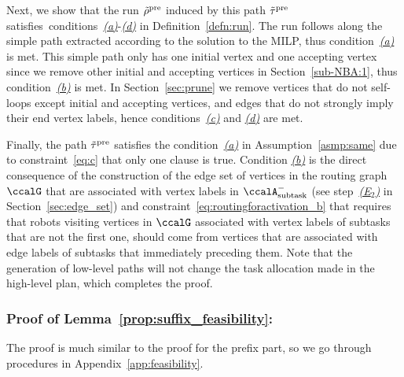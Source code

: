 \documentclass[Afour,sageh,times]{sagej}
\newcommand{\auto}[1]{\ccalA_{\textup{#1}}}
\begin{document}
{Next, we show that the run $\tilde{\rho}^{\textup{pre}}$ induced by this path $\tilde{\tau}^{\textup{pre}}$ satisfies~conditions~\hyperref[cond:a]{\it (a)}-\hyperref[cond:d]{\it (d)} in Definition~\ref{defn:run}. The run  follows along the simple path extracted according to the solution to the MILP, thus condition~\hyperref[cond:a]{\it (a)} is met. This simple path only has one initial vertex and one accepting vertex since we remove other initial and accepting vertices in Section~\ref{sub-NBA:1}, thus condition~\hyperref[cond:b]{\it (b)} is met. In Section~\ref{sec:prune} we remove vertices that do not self-loops except initial and accepting vertices, and  edges that do not strongly imply their end vertex labels, hence conditions~\hyperref[cond:c]{\it (c)} and \hyperref[cond:d]{\it (d)} are  met.

Finally, the path $\tilde{\tau}^{\textup{pre}}$ satisfies the condition~\hyperref[asmp:a]{\it (a)} in Assumption~\ref{asmp:same} due to constraint~\eqref{eq:c} that only one clause is true.  Condition \hyperref[asmp:b]{\it (b)} is the direct consequence of the construction of the edge set of vertices in the routing graph $\ccalG$ that are associated with vertex labels in $\auto{subtask}^-$ (see step~\hyperref[edge:vertex2]{\it (E$_2$)} in Section~\ref{sec:edge_set}) and constraint~\eqref{eq:routingforactivation_b} that requires that robots visiting vertices in $\ccalG$  associated with vertex labels of subtasks that are not the first one, should come from vertices that are associated with edge labels of  subtasks that immediately preceding them. Note that the generation of low-level paths will not change the task allocation made in the high-level plan, which completes the proof.

\subsubsection{Proof of Lemma~\ref{prop:suffix_feasibility}:}\label{app:suffix_feasibility}
The proof is much similar to the proof for the prefix part, so we go through procedures in Appendix~\ref{app:feasibility}.

}
\end{document}
